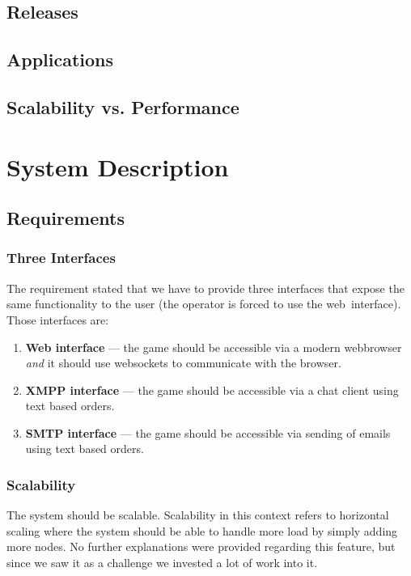 \documentclass[11pt,a4paper]{report}
\newcommand{\hi}[1]{{\color{red}\em #1\/}\\}
\begin{document}
\section{Releases}
\section{Applications}
\section{Scalability vs. Performance}

\chapter{System Description}

\section{Requirements}

\subsection{Three Interfaces}
The requirement stated that we have to provide three interfaces that expose
the same functionality to the user (the operator is forced to use the
web~interface). Those interfaces are:\\
\begin{enumerate}
\item {\bf Web interface} ---
  the game should be accessible via a modern webbrowser {\em and\/} it should
  use websockets to communicate with the browser.
\item {\bf XMPP interface} ---
  the game should be accessible via a chat client using text based orders.
\item {\bf SMTP interface} ---
  the game should be accessible via sending of emails using text based orders.
\end{enumerate}

\subsection{Scalability}
The system should be scalable. Scalability in this context refers to horizontal scaling where the system should be able to handle more load by simply adding more nodes. No further explanations were provided regarding this feature, but since we saw it as a challenge we invested a lot of work into it.
\end{document}
